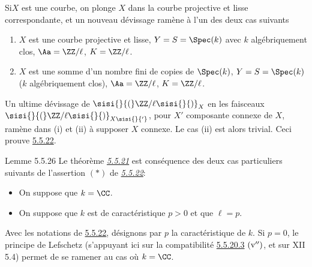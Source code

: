 Si\pageoriginale $X$ est une courbe, on plonge $X$ dans la courbe
projective et lisse correspondante, et un nouveau dévissage ramène à
l'un des deux cas suivants
\begin{enumerate}
\renewcommand{\theenumi}{\roman{enumi}}
\renewcommand{\labelenumi}{(\theenumi)}
\item $X$ est une courbe projective et lisse, $Y=S=\Spec(k)$ avec $k$
algébriquement clos, $\Aa=\ZZ/\ell$, $K=\ZZ/\ell$.

\item $X$ est une somme d'un nombre fini de copies de $\Spec(k)$,
$Y=S=\Spec(k)$ ($k$ algébriquement clos),
$\Aa=\ZZ/\ell$, $K=\ZZ/\ell$.
\end{enumerate}

Un ultime dévissage de $\sisi{}{(}\ZZ/\ell\sisi{}{)}_{X}$ en les faisceaux
$\sisi{}{(}\ZZ/\ell\sisi{}{)}_{X\sisi{}{'}}$, pour $X'$ composante connexe de $X$, ramène dans
(i) et (ii) à supposer $X$ connexe. Le cas (ii) est alors
trivial. Ceci prouve \hyperref[XVII.lem5.5.22]{5.5.22}.

\begin{enonce*}{Lemme 5.5.26}
Le théorème \emph{\hyperref[XVII.thm5.5.21]{5.5.21}} est conséquence des deux cas particuliers
suivants de l'assertion $(\ast)$ de \emph{\hyperref[XVII.lem5.5.22]{5.5.22}}:
\begin{itemize}
\item[\emph{Cas} 1.] On suppose que $k=\CC$.

\item[\emph{Cas} 2.] On suppose que $k$ est de caractéristique $p>0$
et que $\ell=p$.
\end{itemize}
\end{enonce*}

Avec les notations de \hyperref[XVII.lem5.5.22]{5.5.22}, désignons par $p$ la caractéristique de
$k$. Si $p=0$, le principe de Lefschetz (s'appuyant ici sur la
compatibilité \hyperref[XVII.par5.5.20.3]{5.5.20.3} ${\rm(v'')}$, et sur XII 5.4) permet de se
ramener au cas où $k=\CC$.

